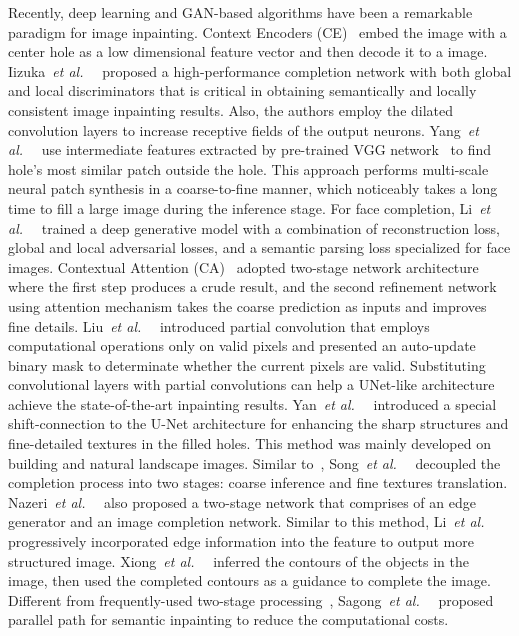 \documentclass[journal]{IEEEtran}
\newcommand{\etal}{\emph{et al.}~}
\begin{document}
Recently, deep learning and GAN-based algorithms have been a remarkable paradigm for image inpainting. Context Encoders (CE)~\cite{CE} embed the  image with a  center hole as a low dimensional feature vector and then decode it to a  image. Iizuka~\etal~\cite{globally-and-locally} proposed a high-performance completion network with both global and local discriminators that is critical in obtaining semantically and locally consistent image inpainting results. Also, the authors employ the dilated convolution layers to increase receptive fields of the output neurons. Yang~\etal~\cite{high-resolution-multi-scale} use intermediate features extracted by pre-trained VGG network~\cite{VGG19} to find hole's most similar patch outside the hole. This approach performs multi-scale neural patch synthesis in a coarse-to-fine manner, which noticeably takes a long time to fill a large image during the inference stage. For face completion, Li~\etal~\cite{GFC} trained a deep generative model with a combination of reconstruction loss, global and local adversarial losses, and a semantic parsing loss specialized for face images. Contextual Attention (CA)~\cite{contextual-attention} adopted two-stage network architecture where the first step produces a crude result, and the second refinement network using attention mechanism takes the coarse prediction as inputs and improves fine details. Liu~\etal~\cite{partial-convolutions} introduced partial convolution that employs computational operations only on valid pixels and presented an auto-update binary mask to determinate whether the current pixels are valid. Substituting convolutional layers with partial convolutions can help a UNet-like architecture~\cite{img-to-img} achieve the state-of-the-art inpainting results. Yan~\etal~\cite{Shift-Net} introduced a special shift-connection to the U-Net architecture for enhancing the sharp structures and fine-detailed textures in the filled holes. This method was mainly developed on building and natural landscape images. Similar to~\cite{high-resolution-multi-scale,contextual-attention}, Song~\etal~\cite{contextual-based} decoupled the completion process into two stages: coarse inference and fine textures translation. Nazeri~\etal~\cite{EdgeConnect} also proposed a two-stage network that comprises of an edge generator and an image completion network. Similar to this method, Li~\etal~\cite{PRVS} progressively incorporated edge information into the feature to output more structured image. Xiong~\etal~\cite{Foreground} inferred the contours of the objects in the image, then used the completed contours as a guidance to complete the image. Different from frequently-used two-stage processing~\cite{StructureFlow}, Sagong~\etal~\cite{PEPSI} proposed parallel path for semantic inpainting to reduce the computational costs. 
\end{document}

